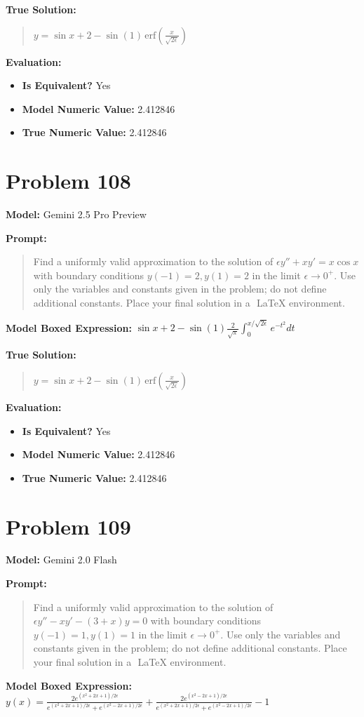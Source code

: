\documentclass{article}
\begin{document}
{\textbf{True Solution:}
\begin{quote}
$y = \sin x + 2 - \sin(1) \, \mathrm{erf}\left(\frac{x}{\sqrt{2\epsilon}}\right)$
\end{quote}

\textbf{Evaluation:}
\begin{itemize}
\item \textbf{Is Equivalent?} Yes
\item \textbf{Model Numeric Value:} 2.412846
\item \textbf{True Numeric Value:} 2.412846
\end{itemize}
\vspace{1cm}
\section*{Problem 108}
\textbf{Model:} Gemini 2.5 Pro Preview

\textbf{Prompt:}
\begin{quote}
Find a uniformly valid approximation to the solution of $\epsilon y'' + x y' = x \cos x$ with boundary conditions $y(-1) = 2, y(1) = 2$ in the limit $\epsilon \to 0^+$. Use only the variables and constants given in the problem; do not define additional constants. Place your final solution in a $\boxed{}$ LaTeX environment.
\end{quote}
\textbf{Model Boxed Expression:} $\sin x + 2 - \sin(1) \frac{2}{\sqrt{\pi}} \int_0^{x/\sqrt{2\epsilon}} e^{-t^2} dt$

\textbf{True Solution:}
\begin{quote}
$y = \sin x + 2 - \sin(1) \, \mathrm{erf}\left(\frac{x}{\sqrt{2\epsilon}}\right)$
\end{quote}

\textbf{Evaluation:}
\begin{itemize}
\item \textbf{Is Equivalent?} Yes
\item \textbf{Model Numeric Value:} 2.412846
\item \textbf{True Numeric Value:} 2.412846
\end{itemize}
\vspace{1cm}
\section*{Problem 109}
\textbf{Model:} Gemini 2.0 Flash

\textbf{Prompt:}
\begin{quote}
Find a uniformly valid approximation to the solution of $\epsilon y'' - x y' - (3 + x)y = 0$ with boundary conditions $y(-1) = 1, y(1) = 1$ in the limit $\epsilon \to 0^+$. Use only the variables and constants given in the problem; do not define additional constants. Place your final solution in a $\boxed{}$ LaTeX environment.
\end{quote}
\textbf{Model Boxed Expression:} $y(x) = \frac{2e^{(x^2+2x+1)/2\epsilon}}{e^{(x^2+2x+1)/2\epsilon}+e^{(x^2-2x+1)/2\epsilon}} + \frac{2e^{(x^2-2x+1)/2\epsilon}}{e^{(x^2+2x+1)/2\epsilon}+e^{(x^2-2x+1)/2\epsilon}} - 1$

}
\end{document}
